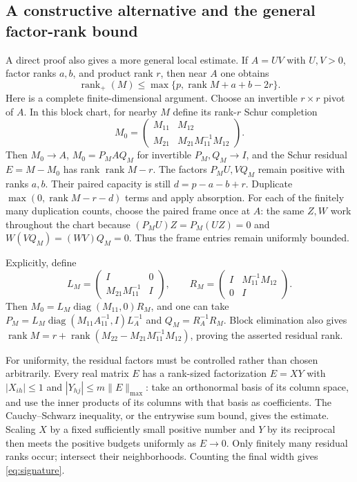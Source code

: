 \documentclass[11pt]{article}
\theoremstyle{definition}\newtheorem{definition}[theorem]{Definition}
\theoremstyle{remark}\newtheorem{remark}[theorem]{Remark}
\newcommand{\rk}{\operatorname{rank}}
\newcommand{\rp}{\operatorname{rank}_{+}}
\begin{document}
\subsection{A constructive alternative and the general factor-rank bound}
A direct proof also gives a more general local estimate. If $A=UV$ with $U,V>0$, factor ranks $a,b$, and product rank $r$, then near $A$ one obtains
\begin{equation}\label{eq:signature}
\rp(M)\le\max\{p,\rk M+a+b-2r\}.
\end{equation}
Here is a complete finite-dimensional argument. Choose an invertible $r\times r$ pivot of $A$. In this block chart, for nearby $M$ define its rank-$r$ Schur completion
\[
M_0=\begin{pmatrix}M_{11}&M_{12}\\M_{21}&M_{21}M_{11}^{-1}M_{12}\end{pmatrix}.
\]
Then $M_0\to A$, $M_0=P_M A Q_M$ for invertible $P_M,Q_M\to I$, and the Schur residual $E=M-M_0$ has rank $\rk M-r$. The factors $P_MU,VQ_M$ remain positive with ranks $a,b$. Their paired capacity is still $d=p-a-b+r$. Duplicate $\max(0,\rk M-r-d)$ terms and apply absorption. For each of the finitely many duplication counts, choose the paired frame once at $A$: the same $Z,W$ work throughout the chart because $(P_MU)Z=P_M(UZ)=0$ and $W(VQ_M)=(WV)Q_M=0$. Thus the frame entries remain uniformly bounded.

Explicitly, define
\[
L_M=\begin{pmatrix}I&0\\M_{21}M_{11}^{-1}&I\end{pmatrix},\qquad
R_M=\begin{pmatrix}I&M_{11}^{-1}M_{12}\\0&I\end{pmatrix}.
\]
Then $M_0=L_M\operatorname{diag}(M_{11},0)R_M$, and one can take
$P_M=L_M\operatorname{diag}(M_{11}A_{11}^{-1},I)L_A^{-1}$ and
$Q_M=R_A^{-1}R_M$. Block elimination also gives
$\rk M=r+\rk(M_{22}-M_{21}M_{11}^{-1}M_{12})$, proving the asserted residual rank.

For uniformity, the residual factors must be controlled rather than chosen arbitrarily. Every real matrix $E$ has a rank-sized factorization $E=XY$ with $|X_{ih}|\le1$ and $|Y_{hj}|\le m\|E\|_{\max}$: take an orthonormal basis of its column space, and use the inner products of its columns with that basis as coefficients. The Cauchy--Schwarz inequality, or the entrywise sum bound, gives the estimate. Scaling $X$ by a fixed sufficiently small positive number and $Y$ by its reciprocal then meets the positive budgets uniformly as $E\to0$. Only finitely many residual ranks occur; intersect their neighborhoods. Counting the final width gives \eqref{eq:signature}.
\end{document}
